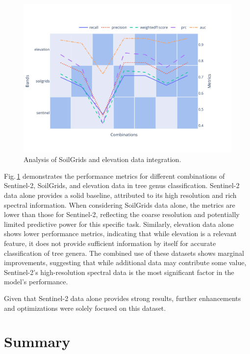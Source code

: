 \begin{figure}[ht]
    \centering
    \includegraphics[width=0.9\linewidth, trim={20pt 40pt 10pt 30pt}, clip]{figures/figures_analysis/soil_elevation_analysis.pdf}
    \caption{Analysis of SoilGrids and elevation data integration.}
    \label{fig:soil_elevation_analysis}
\end{figure}

Fig.\,\ref{fig:soil_elevation_analysis} demonstrates the performance metrics for different combinations of Sentinel-2, SoilGrids, and elevation data in tree genus classification. Sentinel-2 data alone provides a solid baseline, attributed to its high resolution and rich spectral information. When considering SoilGrids data alone, the metrics are lower than those for Sentinel-2, reflecting the coarse resolution and potentially limited predictive power for this specific task. Similarly, elevation data alone shows lower performance metrics, indicating that while elevation is a relevant feature, it does not provide sufficient information by itself for accurate classification of tree genera. The combined use of these datasets shows marginal improvements, suggesting that while additional data may contribute some value, Sentinel-2's high-resolution spectral data is the most significant factor in the model's performance.

Given that Sentinel-2 data alone provides strong results, further enhancements and optimizations were solely focused on this dataset. 

\section{Summary}